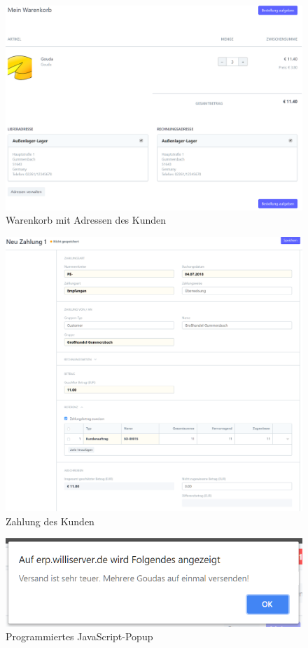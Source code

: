 \begin{figure}[H]
  \centering
  \includegraphics[width=\textwidth]{Bilder/Bestellung.PNG}
  \caption{Warenkorb mit Adressen des Kunden}
  \label{fig:webWarenkorb}
\end{figure}
\begin{figure}[H]
  \centering
  \includegraphics[width=\textwidth]{Bilder/Zahlung_Kunde.PNG}
  \caption{Zahlung des Kunden}
  \label{fig:zahKunde}
\end{figure}
\begin{figure}[H]
  \centering
  \includegraphics[width=\textwidth]{Bilder/JS_Popup.PNG}
  \caption{Programmiertes JavaScript-Popup}
  \label{fig:jsPopup}
\end{figure}
